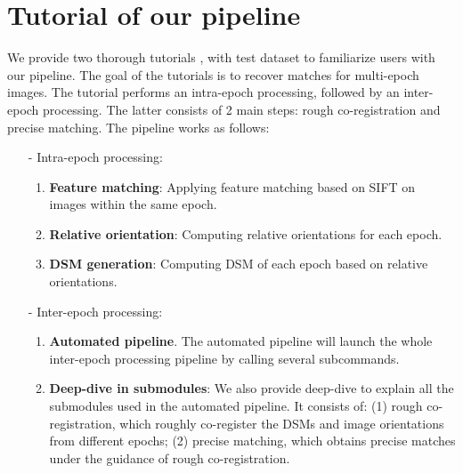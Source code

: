
\chapter{Tutorial of our pipeline}
\label{chap:appendixC}

We provide two thorough tutorials \cite{tuto-aerial}, \cite{tuto-mixed} with test dataset to familiarize users with our pipeline. 
The goal of the tutorials is to recover matches for multi-epoch images. %
The tutorial performs an intra-epoch processing, followed by an inter-epoch processing. The latter consists of 2 main steps: rough co-registration and precise matching. 
The pipeline works as follows:
\begin{itemize}
	\item[-] Intra-epoch processing:
	\begin{enumerate}
		\item \textbf{Feature matching}: Applying feature matching based on SIFT on images within the same epoch.
		\item \textbf{Relative orientation}: Computing relative orientations for each epoch.
		\item \textbf{DSM generation}: Computing DSM of each epoch based on relative orientations.
	\end{enumerate}
	\item[-] Inter-epoch processing:
	\begin{enumerate}
		\item \textbf{Automated pipeline}. The automated pipeline will launch the whole inter-epoch processing pipeline by calling several subcommands.
		\item \textbf{Deep-dive in submodules}: We also provide deep-dive to explain all the submodules used in the automated pipeline. It consists of: (1) rough co-registration, which roughly co-register the DSMs and image orientations from different epochs; (2) precise matching, which obtains precise matches under the guidance of rough co-registration.
	\end{enumerate}	
\end{itemize}
